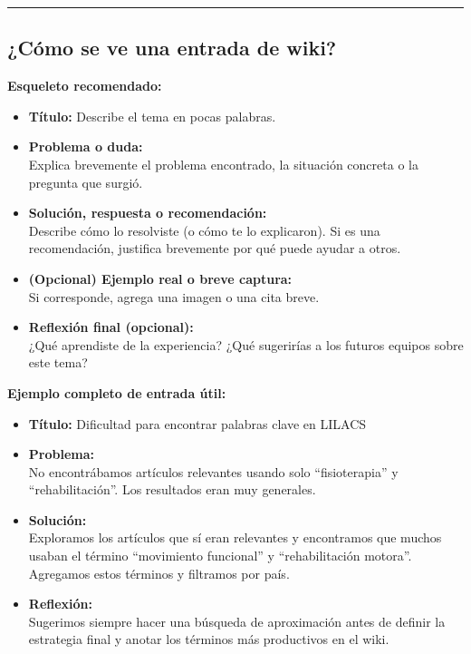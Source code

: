 \documentclass[
  letterpaper,
]{book}
\providecommand{\tightlist}{%
  \setlength{\itemsep}{0pt}\setlength{\parskip}{0pt}}\usepackage{longtable,booktabs,array}
\begin{document}
\begin{center}\rule{0.5\linewidth}{0.5pt}\end{center}

\subsection{¿Cómo se ve una entrada de
wiki?}\label{cuxf3mo-se-ve-una-entrada-de-wiki}

\textbf{Esqueleto recomendado:}

\begin{itemize}
\tightlist
\item
  \textbf{Título:} Describe el tema en pocas palabras.
\item
  \textbf{Problema o duda:}\\
  Explica brevemente el problema encontrado, la situación concreta o la
  pregunta que surgió.
\item
  \textbf{Solución, respuesta o recomendación:}\\
  Describe cómo lo resolviste (o cómo te lo explicaron). Si es una
  recomendación, justifica brevemente por qué puede ayudar a otros.
\item
  \textbf{(Opcional) Ejemplo real o breve captura:}\\
  Si corresponde, agrega una imagen o una cita breve.
\item
  \textbf{Reflexión final (opcional):}\\
  ¿Qué aprendiste de la experiencia? ¿Qué sugerirías a los futuros
  equipos sobre este tema?
\end{itemize}

\textbf{Ejemplo completo de entrada útil:}

\begin{itemize}
\tightlist
\item
  \textbf{Título:} Dificultad para encontrar palabras clave en LILACS
\item
  \textbf{Problema:}\\
  No encontrábamos artículos relevantes usando solo ``fisioterapia'' y
  ``rehabilitación''. Los resultados eran muy generales.
\item
  \textbf{Solución:}\\
  Exploramos los artículos que sí eran relevantes y encontramos que
  muchos usaban el término ``movimiento funcional'' y ``rehabilitación
  motora''. Agregamos estos términos y filtramos por país.
\item
  \textbf{Reflexión:}\\
  Sugerimos siempre hacer una búsqueda de aproximación antes de definir
  la estrategia final y anotar los términos más productivos en el wiki.
\end{itemize}
\end{document}
